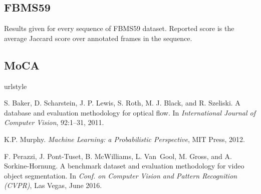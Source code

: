 \documentclass[10pt,twocolumn,letterpaper]{article}
\begin{document}
\subsection{FBMS59}

\begin{table}[H]\centering
{}
\caption{Results given for every sequence of FBMS59 dataset. Reported score is the average Jaccard score over annotated frames in the sequence.}
\end{table}

\subsection{MoCA}





\begin{thebibliography}{28}
\providecommand{\natexlab}[1]{#1}
\providecommand{\url}[1]{\texttt{#1}}
\expandafter\ifx\csname urlstyle\endcsname\relax
  \providecommand{\doi}[1]{doi: #1}\else
  \providecommand{\doi}{doi: \begingroup \urlstyle{rm}\Url}\fi

S. Baker, D. Scharstein, J. P. Lewis, S. Roth, M. J. Black, and R. Szeliski.
\newblock A database and evaluation methodology for optical flow.
\newblock In \emph{International Journal of Computer Vision}, 92:1–31, 2011.


K.P. Murphy.
\newblock \emph{Machine Learning: a Probabilistic Perspective},
\newblock MIT Press, 2012.

F. Perazzi, J. Pont-Tuset, B. McWilliams, L. Van~Gool, M. Gross, and A. Sorkine-Hornung.
\newblock A benchmark dataset and evaluation methodology for video object segmentation.
\newblock In \emph{Conf. on Computer Vision and Pattern Recognition (CVPR)}, Las Vegas, June 2016.
\end{thebibliography}
\end{document}
